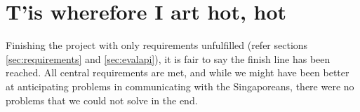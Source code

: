 \section{T'is wherefore I art hot, hot}
Finishing the project with only requirements unfulfilled (refer sections
\ref{sec:requirements} and \ref{sec:evalapi}), it is fair to say the finish line
has been reached. All central requirements are met, and while we might have been
better at anticipating problems in communicating with the Singaporeans, there
were no problems that we could not solve in the end.
